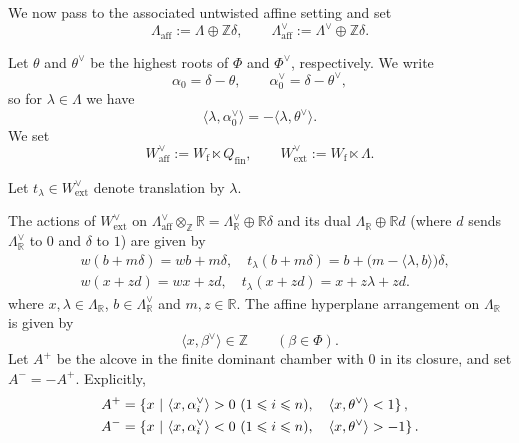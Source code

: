 \documentclass{amsart}
\theoremstyle{definition}
\numberwithin{equation}{section}
\begin{document}
We now pass to the associated untwisted affine setting and set
\[
\Lambda_{\mathrm{aff}}:=\Lambda\oplus \mathbb Z\delta,
\qquad
\Lambda_{\mathrm{aff}}^\vee:=\Lambda^\vee\oplus \mathbb Z\delta.
\]

Let $\theta$ and $\theta^\vee$ be the highest roots of $\Phi$ and
$\Phi^\vee$, respectively. We write
\[
\alpha_0=\delta-\theta,
\qquad
\alpha_0^\vee=\delta-\theta^\vee,
\]
so for
\(\lambda \in \Lambda\) we have
\[
\langle \lambda,\alpha_0^\vee\rangle=-\langle \lambda,\theta^\vee\rangle.
\]
We set
\[
W_{\mathrm{aff}}^\vee:=W_{\mathrm f}\ltimes Q_{\mathrm{fin}},\qquad
W_{\mathrm{ext}}^\vee:=W_{\mathrm f}\ltimes \Lambda.
\]

Let \(t_\lambda\in W_{\mathrm{ext}}^\vee\) denote translation
by \(\lambda\).

The actions of \(W_{\mathrm{ext}}^\vee\) on $\Lambda^\vee_{\mathrm{aff}}\otimes_{\mathbb{Z}}\mathbb{R}=\Lambda^\vee_{\mathbb{R}}\oplus \mathbb{R}\delta$ and its dual $\Lambda_{\mathbb{R}}\oplus \mathbb{R}d$ (where $d$ sends $\Lambda^\vee_{\mathbb{R}}$ to $0$ and $\delta$ to $1$) are  given by
\begin{equation}\label{eq:dual-affine-actions}
\begin{split}
&w(b+m\delta)=wb+m\delta,
\quad t_\lambda(b+m\delta)=b+\bigl(m-\langle\lambda,b\rangle\bigr)\delta,\\
&w(x+zd)=wx+zd, \quad t_\lambda(x+zd)=x+z\lambda+zd. 
\end{split}
\end{equation}
where \(x,\lambda\in\Lambda_{\mathbb{R}}\),
\(b\in\Lambda^\vee_{\mathbb R}\) and $m,z\in \mathbb{R}$.
The affine hyperplane arrangement on
\(\Lambda_{\mathbb R}
\)
is given by
\begin{equation}\label{eq:level-zero-affine-arrangement}
\langle x,\beta^\vee\rangle\in\mathbb Z
\qquad(\beta\in\Phi).
\end{equation}
Let \(A^+\) be the alcove in the finite dominant chamber with \(0\) in its
closure, and set \(A^-=-A^+\). Explicitly,
\begin{align}\label{eq:positive-negative-alcoves}
A^+
&=\left\{x\ \middle|\
\langle x,\alpha_i^\vee\rangle>0\ (1\leqslant i\leqslant n),\quad
\langle x,\theta^\vee\rangle<1\right\},\notag\\
A^-
&=\left\{x\ \middle|\
\langle x,\alpha_i^\vee\rangle<0\ (1\leqslant i\leqslant n),\quad
\langle x,\theta^\vee\rangle>-1\right\}.
\end{align}
\end{document}
